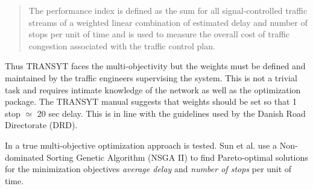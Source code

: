 \begin{quote}
The performance index is defined as the sum for all signal-controlled
traffic streams of a weighted linear combination of estimated delay
and number of stops per unit of time and is used to measure the overall
cost of traffic congestion associated with the traffic control plan.
\end{quote}

Thus TRANSYT faces the multi-objectivity but the weights must be
defined and maintained by the traffic engineers supervising the
system. This is not a trivial task and requires intimate knowledge of
the network as well as the optimization package. The TRANSYT manual
suggests that weights should be set so that 1 stop $\simeq$ 20 sec
delay. This is in line with the guidelines used by the Danish Road
Directorate (DRD).

In \cite{41} a true multi-objective optimization approach is
tested. Sun et al. use a Non-dominated Sorting Genetic Algorithm (NSGA
II) to find Pareto-optimal solutions for the minimization objectives
\textit{average delay} and \textit{number of stops} per unit of time.

